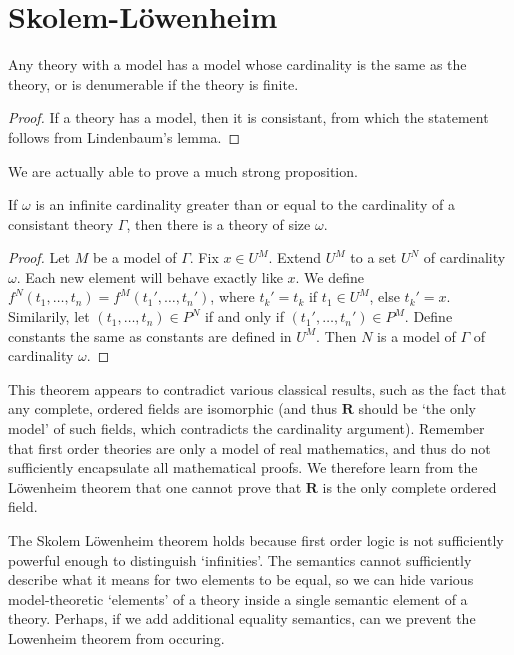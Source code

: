 \section{Skolem-L\"{o}wenheim}

\begin{theorem}
    Any theory with a model has a model whose cardinality is the same as the theory, or is denumerable if the theory is finite.
\end{theorem}
\begin{proof}
    If a theory has a model, then it is consistant, from which the statement follows from Lindenbaum's lemma.
\end{proof}

We are actually able to prove a much strong proposition.

\begin{corollary}
    If $\omega$ is an infinite cardinality greater than or equal to the cardinality of a consistant theory $\Gamma$, then there is a theory of size $\omega$.
\end{corollary}
\begin{proof}
    Let $M$ be a model of $\Gamma$. Fix $x \in U^M$. Extend $U^M$ to a set $U^N$ of cardinality $\omega$. Each new element will behave exactly like $x$. We define $f^N(t_1, \dots, t_n) = f^M(t_1', \dots, t_n')$, where $t_k' = t_k$ if $t_1 \in U^M$, else $t_k' = x$. Similarily, let $(t_1, \dots, t_n) \in P^N$ if and only if $(t_1', \dots, t_n') \in P^M$. Define constants the same as constants are defined in $U^M$. Then $N$ is a model of $\Gamma$ of cardinality $\omega$.
\end{proof}

This theorem appears to contradict various classical results, such as the fact that any complete, ordered fields are isomorphic (and thus $\mathbf{R}$ should be `the only model' of such fields, which contradicts the cardinality argument). Remember that first order theories are only a model of real mathematics, and thus do not sufficiently encapsulate all mathematical proofs. We therefore learn from the L\"{o}wenheim theorem that one cannot prove that $\mathbf{R}$ is the only complete ordered field.

The Skolem L\"{o}wenheim theorem holds because first order logic is not sufficiently powerful enough to distinguish `infinities'. The semantics cannot sufficiently describe what it means for two elements to be equal, so we can hide various model-theoretic `elements' of a theory inside a single semantic element of a theory. Perhaps, if we add additional equality semantics, can we prevent the Lowenheim theorem from occuring.

